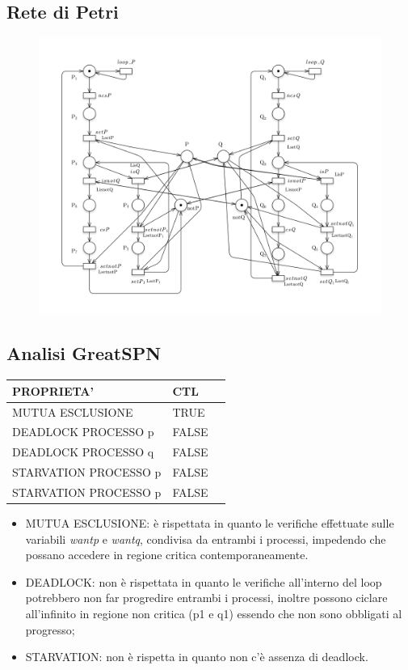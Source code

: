 \documentclass{article}
\begin{document}
\subsection{Rete di Petri}
\begin{figure}[h] 
\centering
\includegraphics[scale=0.3]{3.9PT.png}
\end{figure}
\subsection{Analisi GreatSPN}
\begin{tabular}{ |p{6cm}||p{3cm}|p{3cm}|}
 \hline
 PROPRIETA'& CTL\\
 \hline
 MUTUA ESCLUSIONE&TRUE \\
 DEADLOCK PROCESSO p&FALSE \\
 DEADLOCK PROCESSO q&FALSE\\
 STARVATION PROCESSO p&FALSE\\
 STARVATION PROCESSO p&FALSE\\
\hline
\end{tabular}
\begin{itemize}
    \item MUTUA ESCLUSIONE: è rispettata in quanto le verifiche effettuate sulle variabili \textit{wantp} e \textit{wantq}, condivisa da entrambi i processi, impedendo che possano accedere in regione critica contemporaneamente.
    \item DEADLOCK: non è rispettata in quanto le verifiche all'interno del loop potrebbero non far progredire entrambi i processi, inoltre possono ciclare all'infinito in regione non critica (p1 e q1) essendo che non sono obbligati al progresso;
    \item STARVATION: non è rispetta in quanto non c'è assenza di deadlock.
\end{itemize}
\clearpage
\end{document}
